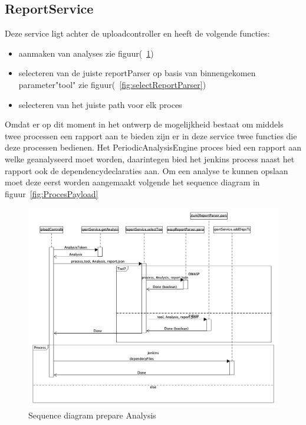 \subsection{ReportService}\label{subsec:reportservice}
Deze service ligt achter de uploadcontroller en heeft de volgende functies:
\begin{itemize}
    \item aanmaken van analyses zie figuur(~\ref{fig:analysisPrepare})
    \item selecteren van de juiste reportParser op basis van binnengekomen parameter"tool" zie figuur(~\ref{fig:selectReportParser})
    \item selecteren van het juiste path voor elk proces
\end{itemize}

Omdat er op dit moment in het ontwerp de mogelijkheid bestaat om middels twee processen een rapport aan te bieden zijn er in deze service twee functies die deze processen bedienen.
Het PeriodicAnalysisEngine proces bied een rapport aan welke geanalyseerd moet worden, daarintegen bied het jenkins process naast het rapport ook de dependencydeclaraties aan. Om een analyse te kunnen opslaan moet deze eerst worden aangemaakt volgende het sequence diagram in figuur~\ref{fig:ProcesPayload}
\begin{figure}[bth]
    \myfloatalign
    \includegraphics[width=14cm]{gfx/umlet/exports/SeqProcessPayload}
    \caption{Sequence diagram prepare Analysis}
    \label{fig:analysisPrepare}
\end{figure}

